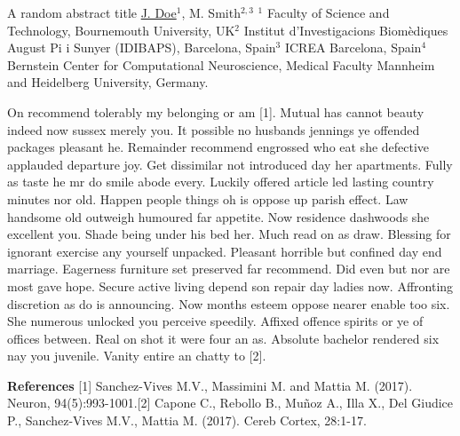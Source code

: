 \begin{abstract_online}{A random abstract title}{%
        \underline{J. Doe}$^{1}$, M. Smith$^{2, 3}$}{%
        }{%
        $^1$ Faculty of Science and Technology, Bournemouth University, UK\newline{}$^2$ Institut d'Investigacions Biom\`{e}diques August Pi i Sunyer (IDIBAPS), Barcelona, Spain\newline{}$^3$ ICREA Barcelona, Spain\newline{}$^4$ Bernstein Center for Computational Neuroscience, Medical Faculty Mannheim and Heidelberg University, Germany.}
        
    On recommend tolerably my belonging or am [1]. Mutual has cannot beauty indeed now sussex merely you. It possible no husbands jennings ye offended packages pleasant he. Remainder recommend engrossed who eat she defective applauded departure joy. Get dissimilar not introduced day her apartments. Fully as taste he mr do smile abode every. Luckily offered article led lasting country minutes nor old. Happen people things oh is oppose up parish effect. Law handsome old outweigh humoured far appetite. Now residence dashwoods she excellent you. Shade being under his bed her. Much read on as draw. Blessing for ignorant exercise any yourself unpacked. Pleasant horrible but confined day end marriage. Eagerness furniture set preserved far recommend. Did even but nor are most gave hope. Secure active living depend son repair day ladies now. Affronting discretion as do is announcing. Now months esteem oppose nearer enable too six. She numerous unlocked you perceive speedily. Affixed offence spirits or ye of offices between. Real on shot it were four an as. Absolute bachelor rendered six nay you juvenile. Vanity entire an chatty to [2]. 
    
        \textbf{References} \newline{}[1] Sanchez-Vives M.V., Massimini M. and Mattia M. (2017). Neuron, 94(5):993-1001.\newline{}[2] Capone C., Rebollo B., Mu{\~n}oz A., Illa X., Del Giudice P., Sanchez-Vives M.V., Mattia M. (2017). Cereb Cortex, 28:1-17.
    \end{abstract_online}
    
